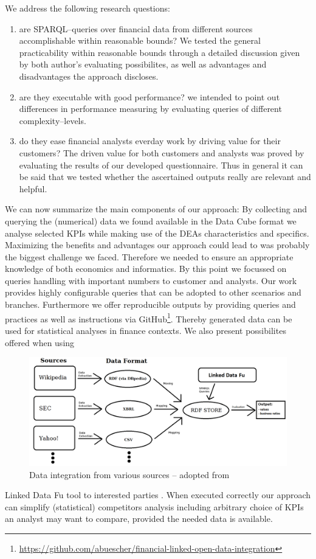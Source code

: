 \documentclass[runningheads]{llncs}
\begin{document}
We address the following research questions:
\begin{enumerate}
\item are SPARQL--queries over financial data from different sources accomplishable within reasonable bounds? We tested the general practicability within reasonable bounds through a detailed discussion given by both author's evaluating possibilites, as well as advantages and disadvantages the approach discloses.
\item are they executable with good performance? we intended to point out differences in performance measuring by evaluating queries of different complexity--levels. 
\item do they ease financial analysts everday work by driving value for their customers? The driven value for both customers and analysts was proved by evaluating the results of our developed questionnaire. Thus in general it can be said that we tested whether the ascertained outputs really are relevant and helpful.
\end{enumerate}
We can now summarize the main components of our approach: By collecting and querying the (numerical) data we found available in the Data Cube format we analyse selected KPIs while making use of the DEAs characteristics and specifics.\\
Maximizing the benefits and advantages our approach could lead to was probably the biggest challenge we faced. Therefore we needed to ensure an appropriate knowledge of both economics and informatics. By this point we focussed on queries handling with important numbers to customer and analysts. Our work provides highly configurable queries that can be adopted to other scenarios and branches. Furthermore we offer reproducible outputs by providing queries and practices as well as instructions via GitHub\footnote{\url{https://github.com/abuescher/financial-linked-open-data-integration}}. Thereby generated data can be used for statistical analyses in finance contexts. We also present possibilites offered when using
\begin{figure}[!t]
\centering
\includegraphics[scale=0.2]{1_graphics/extract_neu.png}
\caption{Data integration from various sources -- adopted from \cite{KWOW14}}
\end{figure}
Linked Data Fu tool to interested parties \cite{SSHS13}. When executed correctly our approach can simplify (statistical) competitors analysis including arbitrary choice of KPIs an analyst may want to compare, provided the needed data is available.
\end{document}
